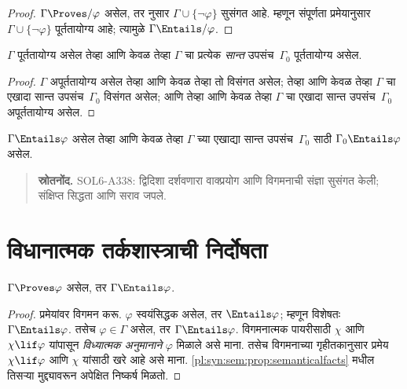 \begin{proof}
$\Gamma\Proves/ \varphi$ असेल, तर  नुसार
$\Gamma \cup \{\lnot \varphi\}$ सुसंगत आहे. म्हणून संपूर्णता
प्रमेयानुसार $\Gamma \cup \{\lnot \varphi\}$ पूर्ततायोग्य आहे;
त्यामुळे $\Gamma \Entails/ \varphi$.
\end{proof}

\begin{prop}[संहतता प्रमेय]
\label{pl:prp:com:prop:compactness}
$\Gamma$ पूर्ततायोग्य असेल तेव्हा आणि केवळ तेव्हा $\Gamma$ चा प्रत्येक
\emph{सान्त} उपसंच~$\Gamma_0$ पूर्ततायोग्य असेल.
\end{prop}

\begin{proof}
$\Gamma$ अपूर्ततायोग्य असेल तेव्हा आणि केवळ तेव्हा तो विसंगत असेल;
तेव्हा आणि केवळ तेव्हा $\Gamma$ चा एखादा सान्त उपसंच~$\Gamma_0$
विसंगत असेल; आणि तेव्हा आणि केवळ तेव्हा $\Gamma$ चा एखादा सान्त
उपसंच~$\Gamma_0$ अपूर्ततायोग्य असेल.
\end{proof}

\begin{cor}
$\Gamma \Entails \varphi$ असेल तेव्हा आणि केवळ तेव्हा $\Gamma$ च्या
एखाद्या सान्त उपसंच~$\Gamma_0$ साठी $\Gamma_0 \Entails \varphi$ असेल.
\end{cor}



\begin{quote}\small\textbf{स्रोतनोंद.} SOL6-A338: द्विदिशा दर्शवणारा वाक्प्रयोग आणि विगमनाची संज्ञा सुसंगत केली; संक्षिप्त सिद्धता आणि सराव जपले.\end{quote}











\section{विधानात्मक तर्कशास्त्राची निर्दोषता}\label{pl:prp:snd:sec}

\begin{thm}[निर्दोषता]
\label{pl:prp:snd:thm:soundness}
$\Gamma\Proves\varphi$ असेल, तर
$\Gamma \Entails \varphi$.
\end{thm}

\begin{proof}
प्रमेयांवर विगमन करू. $\varphi$ स्वयंसिद्धक असेल, तर $\Entails
\varphi$; म्हणून विशेषतः $\Gamma \Entails\varphi$. तसेच $\varphi \in \Gamma$
असेल, तर $\Gamma \Entails\varphi$. विगमनात्मक पायरीसाठी $\chi$
आणि $\chi\lif\varphi$ यांपासून \emph{विध्यात्मक अनुमानाने} $\varphi$
मिळाले असे माना. तसेच विगमनाच्या गृहीतकानुसार प्रमेय
$\chi\lif \varphi$ आणि $\chi$ यांसाठी खरे आहे असे माना.
\ref{pl:syn:sem:prop:semanticalfacts} मधील तिसऱ्या मुद्द्यावरून
अपेक्षित निष्कर्ष मिळतो.
\end{proof}

